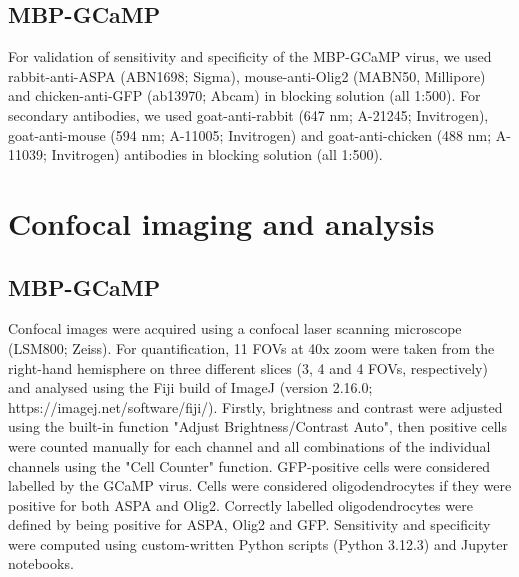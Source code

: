 \subsection{MBP-GCaMP}
For validation of sensitivity and specificity of the MBP-GCaMP virus, we used rabbit-anti-ASPA (ABN1698; Sigma), mouse-anti-Olig2 (MABN50, Millipore) and chicken-anti-GFP (ab13970; Abcam) in blocking solution (all 1:500). For secondary antibodies, we used goat-anti-rabbit (647 nm; A-21245; Invitrogen), goat-anti-mouse (594 nm; A-11005; Invitrogen) and goat-anti-chicken (488 nm; A-11039; Invitrogen) antibodies in blocking solution (all 1:500).
\section{Confocal imaging and analysis}
\subsection{MBP-GCaMP}
Confocal images were acquired using a confocal laser scanning microscope (LSM800; Zeiss).
For quantification, 11 FOVs at 40x zoom were taken from the right-hand hemisphere on three different slices (3, 4 and 4 FOVs, respectively) and analysed using the Fiji build of ImageJ (version 2.16.0; https://imagej.net/software/fiji/). Firstly, brightness and contrast were adjusted using the built-in function "Adjust Brightness/Contrast Auto", then positive cells were counted manually for each channel and all combinations of the individual channels using the "Cell Counter" function.
GFP-positive cells were considered labelled by the GCaMP virus. Cells were considered oligodendrocytes if they were positive for both ASPA and Olig2. Correctly labelled oligodendrocytes were defined by being positive for ASPA, Olig2 and GFP. Sensitivity and specificity were computed using custom-written Python scripts (Python 3.12.3) and Jupyter notebooks.
